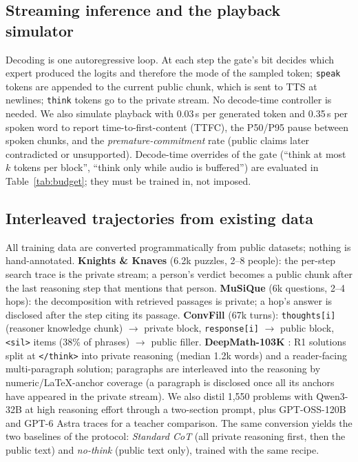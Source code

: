 \documentclass[letterpaper]{article} %
\newcommand{\think}{\texttt{think}}
\newcommand{\speak}{\texttt{speak}}
\begin{document}
\subsection{Streaming inference and the playback simulator}
Decoding is one autoregressive loop. At each step the gate's bit decides which expert produced the logits and therefore the mode of the sampled token; \speak{} tokens are appended to the current public chunk, which is sent to TTS at newlines; \think{} tokens go to the private stream. No decode-time controller is needed. We also simulate playback with 0.03\,s per generated token and 0.35\,s per spoken word to report time-to-first-content (TTFC), the P50/P95 pause between spoken chunks, and the \emph{premature-commitment} rate (public claims later contradicted or unsupported). Decode-time overrides of the gate (``think at most $k$ tokens per block'', ``think only while audio is buffered'') are evaluated in Table~\ref{tab:budget}; they must be trained in, not imposed.

\subsection{Interleaved trajectories from existing data}\label{sec:data}
All training data are converted programmatically from public datasets; nothing is hand-annotated.
\textbf{Knights \& Knaves} \citep{xie2024kk} (6.2k puzzles, 2--8 people): the per-step search trace is the private stream; a person's verdict becomes a public chunk after the last reasoning step that mentions that person.
\textbf{MuSiQue} \citep{trivedi2022musique} (6k questions, 2--4 hops): the decomposition with retrieved passages is private; a hop's answer is disclosed after the step citing its passage.
\textbf{ConvFill} \citep{srinivas2025convfill} (67k turns): \texttt{thoughts[i]} (reasoner knowledge chunk) $\to$ private block, \texttt{response[i]} $\to$ public block, \texttt{<sil>} items (38\% of phrases) $\to$ public filler.
\textbf{DeepMath-103K} \citep{he2025deepmath}: R1 solutions split at \texttt{</think>} into private reasoning (median 1.2k words) and a reader-facing multi-paragraph solution; paragraphs are interleaved into the reasoning by numeric/LaTeX-anchor coverage (a paragraph is disclosed once all its anchors have appeared in the private stream). We also distil 1,550 problems with Qwen3-32B at high reasoning effort through a two-section prompt, plus GPT-OSS-120B and GPT-6 Astra traces for a teacher comparison.
The same conversion yields the two baselines of the protocol: \emph{Standard CoT} (all private reasoning first, then the public text) and \emph{no-think} (public text only), trained with the same recipe.
\end{document}
